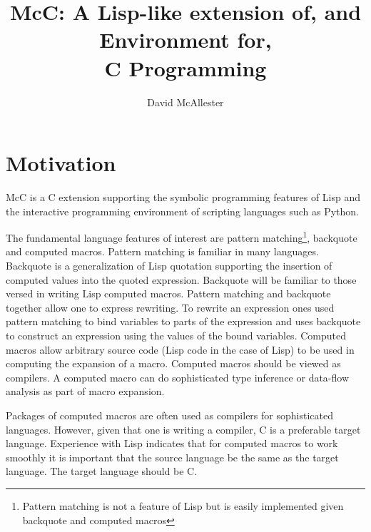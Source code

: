 \documentclass{article}
\title{McC: A Lisp-like extension of, and Environment for,  \\C Programming}
\author{David McAllester}
\begin{document}
\maketitle

\section{Motivation}

\bigskip
\bigskip

McC is a C extension supporting the symbolic programming features of Lisp and the interactive programming environment of scripting languages such as Python.

The fundamental language features of interest are pattern matching\footnote{Pattern matching is not a feature of Lisp but is easily implemented given backquote and computed macros},
backquote and computed macros. Pattern matching is familiar in many languages.  Backquote is a generalization of Lisp quotation supporting
the insertion of computed values into the quoted expression. Backquote will be familiar to
those versed in writing Lisp computed macros. Pattern matching and backquote together allow one to express rewriting.  To rewrite an expression
ones used pattern matching to bind variables to parts of the expression and uses backquote to construct an expression using the values of the bound variables.
Computed macros allow arbitrary source code (Lisp code in the case of Lisp) to be
used in computing the expansion of a macro.  Computed macros should be viewed as compilers.  A computed macro can do
sophisticated type inference or data-flow analysis as part of macro expansion.

Packages of computed macros are often used as compilers for sophisticated languages.  However, given that one is writing a compiler, C is a preferable target language.
Experience with Lisp indicates that for computed macros to work smoothly it is important that the source language be the same as the target language.  The target language should be C.
\end{document}
